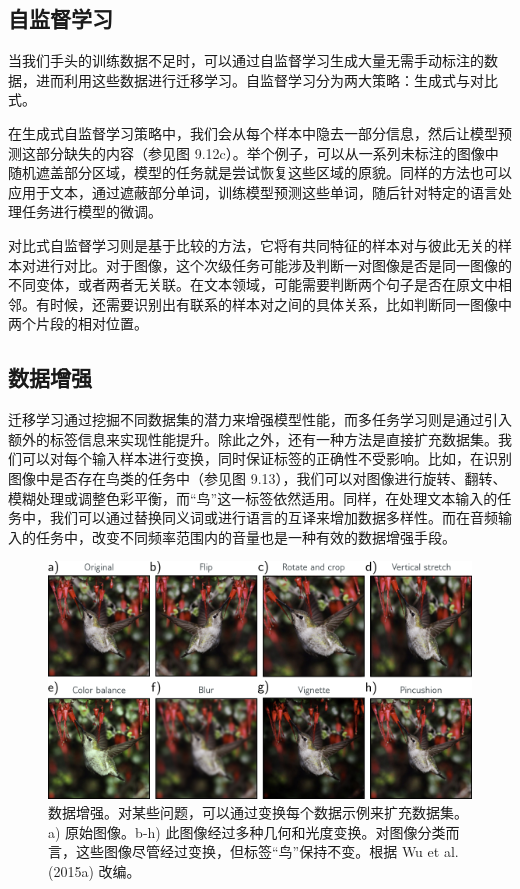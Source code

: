 \subsection{自监督学习}
当我们手头的训练数据不足时，可以通过自监督学习生成大量无需手动标注的数据，进而利用这些数据进行迁移学习。自监督学习分为两大策略：生成式与对比式。

在生成式自监督学习策略中，我们会从每个样本中隐去一部分信息，然后让模型预测这部分缺失的内容（参见图 9.12c）。举个例子，可以从一系列未标注的图像中随机遮盖部分区域，模型的任务就是尝试恢复这些区域的原貌。同样的方法也可以应用于文本，通过遮蔽部分单词，训练模型预测这些单词，随后针对特定的语言处理任务进行模型的微调。

对比式自监督学习则是基于比较的方法，它将有共同特征的样本对与彼此无关的样本对进行对比。对于图像，这个次级任务可能涉及判断一对图像是否是同一图像的不同变体，或者两者无关联。在文本领域，可能需要判断两个句子是否在原文中相邻。有时候，还需要识别出有联系的样本对之间的具体关系，比如判断同一图像中两个片段的相对位置。
\subsection{数据增强}
迁移学习通过挖掘不同数据集的潜力来增强模型性能，而多任务学习则是通过引入额外的标签信息来实现性能提升。除此之外，还有一种方法是直接扩充数据集。我们可以对每个输入样本进行变换，同时保证标签的正确性不受影响。比如，在识别图像中是否存在鸟类的任务中（参见图 9.13），我们可以对图像进行旋转、翻转、模糊处理或调整色彩平衡，而“鸟”这一标签依然适用。同样，在处理文本输入的任务中，我们可以通过替换同义词或进行语言的互译来增加数据多样性。而在音频输入的任务中，改变不同频率范围内的音量也是一种有效的数据增强手段。

\begin{figure}[ht!]
	\centering
	\includegraphics[width=0.7\linewidth]{png/chapter9/RegAugment.png}
	\caption{数据增强。对某些问题，可以通过变换每个数据示例来扩充数据集。a) 原始图像。b-h) 此图像经过多种几何和光度变换。对图像分类而言，这些图像尽管经过变换，但标签“鸟”保持不变。根据 Wu et al. (2015a) 改编。}
\end{figure}


